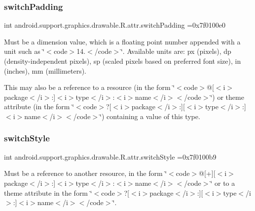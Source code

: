 \subsubsection{\texorpdfstring{switch\+Padding}{switchPadding}}
{\footnotesize\ttfamily int android.\+support.\+graphics.\+drawable.\+R.\+attr.\+switch\+Padding =0x7f0100e0\hspace{0.3cm}{\ttfamily [static]}}

Must be a dimension value, which is a floating point number appended with a unit such as \char`\"{}$<$code$>$14.\+5sp$<$/code$>$\char`\"{}. Available units are\+: px (pixels), dp (density-\/independent pixels), sp (scaled pixels based on preferred font size), in (inches), mm (millimeters). 

This may also be a reference to a resource (in the form \char`\"{}$<$code$>$@\mbox{[}$<$i$>$package$<$/i$>$\+:\mbox{]}$<$i$>$type$<$/i$>$\+:$<$i$>$name$<$/i$>$$<$/code$>$\char`\"{}) or theme attribute (in the form \char`\"{}$<$code$>$?\mbox{[}$<$i$>$package$<$/i$>$\+:\mbox{]}\mbox{[}$<$i$>$type$<$/i$>$\+:\mbox{]}$<$i$>$name$<$/i$>$$<$/code$>$\char`\"{}) containing a value of this type. \mbox{\label{classandroid_1_1support_1_1graphics_1_1drawable_1_1R_1_1attr_a25aa2fb7ddce98d1bc5226ef73945402}} 
\subsubsection{\texorpdfstring{switch\+Style}{switchStyle}}
{\footnotesize\ttfamily int android.\+support.\+graphics.\+drawable.\+R.\+attr.\+switch\+Style =0x7f0100b9\hspace{0.3cm}{\ttfamily [static]}}

Must be a reference to another resource, in the form \char`\"{}$<$code$>$@\mbox{[}+\mbox{]}\mbox{[}$<$i$>$package$<$/i$>$\+:\mbox{]}$<$i$>$type$<$/i$>$\+:$<$i$>$name$<$/i$>$$<$/code$>$\char`\"{} or to a theme attribute in the form \char`\"{}$<$code$>$?\mbox{[}$<$i$>$package$<$/i$>$\+:\mbox{]}\mbox{[}$<$i$>$type$<$/i$>$\+:\mbox{]}$<$i$>$name$<$/i$>$$<$/code$>$\char`\"{}. \mbox{\label{classandroid_1_1support_1_1graphics_1_1drawable_1_1R_1_1attr_ae4136f0b8e34a87a16645462ebdba735}} 
